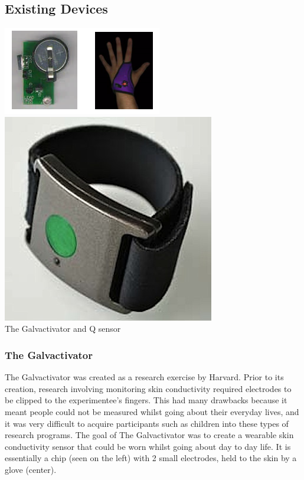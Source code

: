 \documentclass{scrartcl}
\begin{document}
\subsection{Existing Devices}
\begin{center}
    \includegraphics[scale=0.8]{img/existingdevices.png} \hspace{10mm} 
    \includegraphics[scale=0.3]{img/q-sensor.jpg}\\
    The Galvactivator and Q sensor
\end{center}
\subsubsection{The Galvactivator}
The Galvactivator was created as a research exercise by Harvard. Prior to its creation,
research involving monitoring skin conductivity required electrodes to be clipped to the
experimentee's fingers. This had many drawbacks because it meant people could not be measured
whilst going about their everyday lives, and it was very difficult to acquire participants
such as children into these types of research programs. The goal of The Galvactivator was to
create a wearable skin conductivity sensor that could be worn whilst going about day to day
life. It is essentially a chip (seen on the left) with 2 small electrodes, held to the skin
by a glove (center). 
\end{document}
